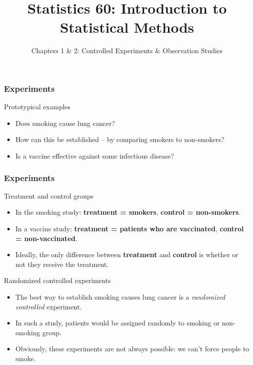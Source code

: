 \documentclass[handout]{beamer}
\title{Statistics 60: Introduction to Statistical Methods}
\subtitle{Chapters 1 \& 2: Controlled Experiments \& Observation Studies}
\author{}%
\begin{document}
   \begin{frame}
   \titlepage
   \end{frame}


   \begin{frame} \frametitle{Experiments}

   \begin{block}
   {Prototypical examples}
   \begin{itemize}
   \item Does smoking cause lung cancer?
   \item How can this be established -- by comparing smokers to non-smokers?
   \item Is a vaccine effective against some infectious disease?
   \end{itemize}
   \end{block}
   \end{frame}


   \begin{frame} \frametitle{Experiments}

   \begin{block}
   {Treatment and control groups}

   \begin{itemize}
   \item In the smoking study: {\bf \color{red} treatment = smokers}, {\bf \color{blue} control = non-smokers}.
   \item In a  vaccine study: {\bf \color{red} treatment = patients who are vaccinated}, {\bf \color{blue} control = non-vaccinated}.
   \item Ideally, the only difference between {\bf \color{red} treatment} and {\bf \color{blue} control} is whether or not they receive the treatment.
   \end{itemize}
   \end{block}

   \begin{block}
   {Randomized controlled experiments}

   \begin{itemize}
   \item The best way to establish smoking causes lung cancer is a {\em randomized controlled} experiment.
   \item In such a study, patients would be assigned randomly to smoking or non-smoking group.
   \item Obviously, these experiments are not always possible: we can't force people to smoke.
   \end{itemize}
   \end{block}
   \end{frame}
\end{document}
